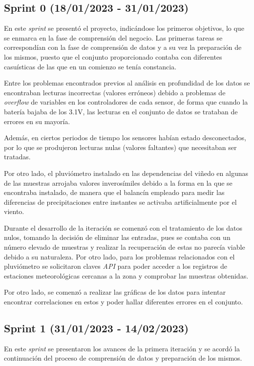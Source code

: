 \subsection{Sprint 0 (18/01/2023 - 31/01/2023)}
En este \textit{sprint} se presentó el proyecto, indicándose los primeros objetivos, lo que se enmarca en la fase de comprensión
del negocio.
Las primeras tareas se correspondían con la fase de comprensión de datos y a su vez la preparación de los mismos, 
puesto que el conjunto proporcionado contaba con diferentes casuísticas de las que en un comienzo se tenía constancia.

Entre los problemas encontrados previos al análisis en profundidad de los datos se encontraban lecturas incorrectas (valores erróneos) 
debido a problemas de \textit{overflow} de variables en los controladores de cada sensor, de forma que cuando la batería bajaba
de los 3.1V, las lecturas en el conjunto de datos se trataban de errores en su mayoría.

Además, en ciertos periodos de tiempo los sensores habían estado desconectados, por lo que se produjeron lecturas nulas (valores faltantes)
que necesitaban ser tratadas.

Por otro lado, el pluviómetro instalado en las dependencias del viñedo en algunas de las muestras arrojaba valores
inverosímiles debido a la forma en la que se encontraba instalado, de manera que el balancín empleado para medir las diferencias de 
precipitaciones entre instantes se activaba artificialmente por el viento.

Durante el desarrollo de la iteración se comenzó con el tratamiento de los datos nulos, tomando la decisión de eliminar las entradas, pues se
contaba con un número elevado de muestras y realizar la recuperación de estas no parecía viable debido a su naturaleza.
Por otro lado, para los problemas relacionados con el pluviómetro se solicitaron claves \textit{API} para poder acceder a los registros 
de estaciones meteorológicas cercanas a la zona y comprobar las muestras obtenidas.

Por otro lado, se comenzó a realizar las gráficas de los datos para intentar encontrar correlaciones en estos y poder hallar diferentes 
errores en el conjunto.

\subsection{Sprint 1 (31/01/2023 - 14/02/2023)}
En este \textit{sprint} se presentaron los avances de la primera iteración y se acordó la continuación del proceso de comprensión de datos y 
preparación de los mismos.

